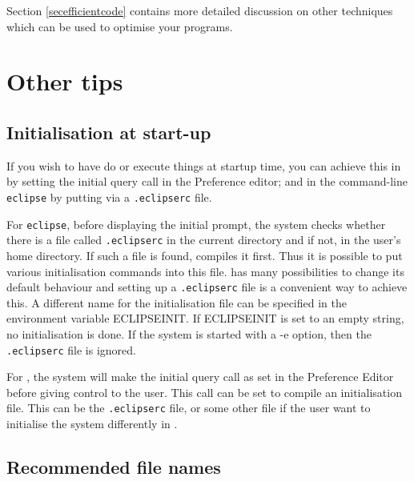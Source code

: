Section \ref{secefficientcode} contains more detailed discussion on other
techniques which can be used to optimise your programs.


\section{Other tips}

\subsection{Initialisation at start-up}

If you wish to have {\eclipse} do or execute things at startup time, you
can achieve this in {\tkeclipse} by setting the initial query call in the
Preference editor; and in the command-line \texttt{eclipse} by putting via a {\tt .eclipserc} file.

For \texttt{eclipse},
before displaying the initial prompt, the system checks whether there is a file
called {\tt .eclipserc} in the current directory and if not, in the user's home
\label{eclipserc}
directory.  If such a file is found, {\eclipse} compiles it first.
Thus it is possible to put various initialisation commands into
this file.
{\eclipse} has many possibilities to change its default behaviour and
setting up a {\tt .eclipserc} file is a convenient way to achieve this.
A different name for the initialisation file can be specified
in the environment variable ECLIPSEINIT.
If ECLIPSEINIT is set to an empty string, no initialisation is done.
If the system is started with a -e option, then the {\tt .eclipserc} file
is ignored.

For {\tkeclipse}, the system will make the initial query call as set in the
Preference Editor before giving control to the user. This call can be set
to compile an initialisation file. This can be the {\tt .eclipserc} file,
or some other file if the user want to initialise the system differently in
{\tkeclipse}. 

\subsection{Recommended file names}

